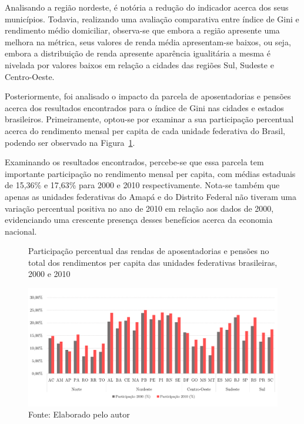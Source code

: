 Analisando a região nordeste, é notória a redução do indicador acerca dos seus municípios. Todavia, realizando uma avaliação comparativa entre índice de Gini e rendimento médio domiciliar, observa-se que embora a região apresente uma melhora na métrica, seus valores de renda média apresentam-se baixos, ou seja, embora a distribuição de renda apresente aparência igualitária a mesma é nivelada por valores baixos em relação a cidades das regiões Sul, Sudeste e Centro-Oeste. 

\pagebreak

Posteriormente, foi analisado o impacto da parcela de aposentadorias e pensões acerca dos resultados encontrados para o índice de Gini nas cidades e estados brasileiros. Primeiramente, optou-se por examinar a sua participação percentual acerca do rendimento mensal per capita de cada unidade federativa do Brasil, podendo ser observado na Figura~\ref{fig:cap04:aposen_pensao_estados}.

Examinando os resultados encontrados, percebe-se que essa parcela tem importante participação no rendimento mensal per capita, com médias estaduais de 15,36\% e 17,63\% para 2000 e 2010 respectivamente. Nota-se também que apenas as unidades federativas do Amapá e do Distrito Federal não tiveram uma variação percentual positiva no ano de 2010 em relação aos dados de 2000, evidenciando uma crescente presença desses benefícios acerca da economia nacional.

\begin{figure}[!ht]
    \centering
    \caption{Participação percentual das rendas de aposentadorias e pensões no total dos rendimentos per capita das unidades federativas brasileiras, 2000 e 2010}
    \includegraphics[width=\textwidth]{figs/cap04_aposen_pensao_estados.pdf}
    \caption*{\footnotesize{Fonte: Elaborado pelo autor}}
    \label{fig:cap04:aposen_pensao_estados}
\end{figure}

